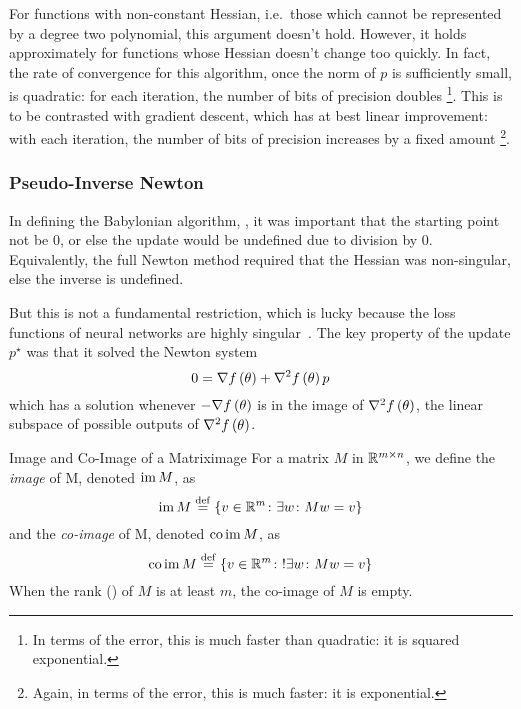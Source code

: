 \documentclass[../../thesis.tex]{subfiles}
\begin{document}
For functions with non-constant Hessian,
i.e.~those which cannot be represented by a degree two polynomial,
this argument doesn't hold.
However, it holds approximately for functions whose Hessian
doesn't change too quickly.
In fact, the rate of convergence for this algorithm,
once the norm of $p$ is sufficiently small,
is quadratic:
for each iteration, the number of bits of precision doubles%
\footnote{In terms of the error, this is much faster than quadratic:
it is squared exponential.}.
This is to be contrasted with gradient descent,
which has at best linear improvement:
with each iteration, the number of bits of precision increases by a fixed amount%
\footnote{Again, in terms of the error, this is much faster:
it is exponential.}.

\subsubsection{Pseudo-Inverse Newton}

In defining the Babylonian algorithm,
,
it was important that the starting point not be $0$,
or else the update would be undefined due to division by $0$.
Equivalently,
the full Newton method 
required that the Hessian was non-singular,
else the inverse is undefined.

But this is not a fundamental restriction,
which is lucky because the loss functions of neural networks
are highly singular~\cite{sagun2017}.
The key property of the update $p^\star$
was that it solved the Newton system
\begin{equation}\equationlabel{newtonsystem}
	0 = \grad{f}{\theta} + \hess{f}{\theta}p
\end{equation}
\noindent which has a solution whenever $-\nabla f\left(\theta\right)$
is in the image of $\nabla^2f\left(\theta\right)$,
the linear subspace of possible outputs of $\nabla^2f\left(\theta\right)$.

\begin{definition}{Image and Co-Image of a Matrix}{image}
	For a matrix $M$ in $\mathbb{R}^{m \times n}$,
	we define the \emph{image} of M, denoted $\operatorname*{im} M$, as
	\begin{equation}
		\operatorname*{im} M \stackrel{\small \mathrm{def}}{=} \left\{v \in \mathbb{R}^m \colon \exists w \colon Mw=v\right\}
	\end{equation}
	and the \emph{co-image} of M, denoted $\operatorname*{co}\operatorname*{im} M$, as
	\begin{equation}
		\operatorname*{co}\operatorname*{im} M \stackrel{\small \mathrm{def}}{=} \left\{v \in \mathbb{R}^m \colon !\exists w \colon Mw=v\right\}
	\end{equation}
	When the rank () of $M$ is at least $m$,
	the co-image of $M$ is empty.
\end{definition}
\end{document}
